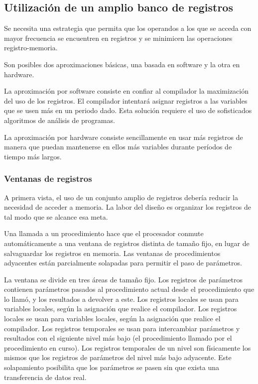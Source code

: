 \subsection{Utilización de un amplio banco de registros}

Se necesita una estrategia que permita que los operandos a los que se acceda con mayor frecuencia se encuentren en registros y se minimicen las operaciones registro-memoria.

Son posibles dos aproximaciones básicas, una basada en software y la otra en hardware.

La aproximación por software consiste en confiar al compilador la maximización del uso de los registros. El compilador intentará asignar registros a las variables que se usen más en un periodo dado. Esta solución requiere el uso de sofisticados algoritmos de análisis de programas.

La aproximación por hardware consiste sencillamente en usar más registros de manera que puedan mantenerse en ellos más variables durante períodos de tiempo más largos.

\subsubsection*{Ventanas de registros}

A primera vista, el uso de un conjunto amplio de registros debería reducir la necesidad de acceder a memoria. La labor del diseño es organizar los registros de tal modo que se alcance esa meta.

Una llamada a un procedimiento hace que el procesador conmute automáticamente a una ventana de registros distinta de tamaño fijo, en lugar de salvaguardar los registros en memoria. Las ventanas de procedimientos adyacentes están parcialmente solapadas para permitir el paso de parámetros.

La ventana se divide en tres áreas de tamaño fijo. Los registros de parámetros contienen parámetros pasados al procedimiento actual desde el procedimiento que lo llamó, y los resultados a devolver a este. Los registros locales se usan para variables locales, según la asignación que realice el compilador. Los registros locales se usan para variables locales, según la asignación que realice el compilador. Los registros temporales se usan para intercambiar parámetros y resultados con el siguiente nivel más bajo (el procedimiento llamado por el procedimiento en curso). Los registros temporales de un nivel son físicamente los mismos que los registros de parámetros del nivel más bajo adyacente. Este solapamiento posibilita que los parámetros se pasen sin que exista una transferencia de datos real.

